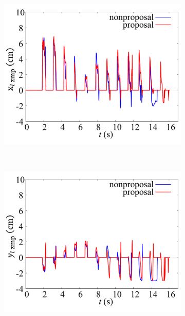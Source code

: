 \documentclass[autodetect-engine,dvipdfmx-if-dvi,ja=standard,a4j,jbase=11pt,magstyle=nomag*]{bxjsreport}
\begin{document}


\begin{figure}[t]%
    \centering%
    \begin{minipage}{0.49\linewidth}%
        \centering
        \begin{subfigure}[c]{\linewidth}
            \centering%
            \includegraphics[width=\linewidth, clip]{./figure/fig11a.pdf}%
            \label{fig:zmp_lx}%
        \end{subfigure}\\ %
        \begin{subfigure}[c]{\linewidth}
            \centering%
            \includegraphics[width=\linewidth, clip]{./figure/fig11b.pdf}%

\end{subfigure}
\end{minipage}
\end{figure}
\end{document}
